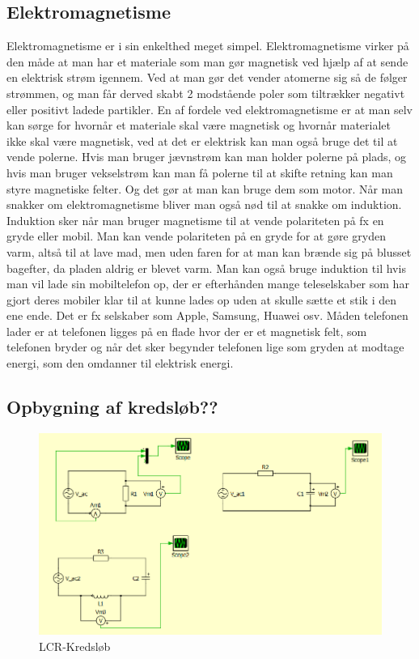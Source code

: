 \subsection{Elektromagnetisme}
Elektromagnetisme er i sin enkelthed meget simpel. Elektromagnetisme virker på den måde at man har et materiale som man gør magnetisk ved hjælp af at sende en elektrisk strøm igennem. Ved at man gør det vender atomerne sig så de følger strømmen, og man får derved skabt 2 modstående poler som tiltrækker negativt eller positivt ladede partikler. En af fordele ved elektromagnetisme er at man selv kan sørge for hvornår et materiale skal være magnetisk og hvornår materialet ikke skal være magnetisk, ved at det er elektrisk kan man også bruge det til at vende polerne. Hvis man bruger jævnstrøm kan man holder polerne på plads, og hvis man bruger vekselstrøm kan man få polerne til at skifte retning kan man styre magnetiske felter. Og det gør at man kan bruge dem som motor. Når man snakker om elektromagnetisme bliver man også nød til at snakke om induktion. Induktion sker når man bruger magnetisme til at vende polariteten på fx en gryde eller mobil. Man kan vende polariteten på en gryde for at gøre gryden varm, altså til at lave mad, men uden faren for at man kan brænde sig på blusset bagefter, da pladen aldrig er blevet varm. Man kan også bruge induktion til hvis man vil lade sin mobiltelefon op, der er efterhånden mange teleselskaber som har gjort deres mobiler klar til at kunne lades op uden at skulle sætte et stik i den ene ende. Det er fx selskaber som Apple, Samsung, Huawei osv. Måden telefonen lader er at telefonen ligges på en flade hvor der er et magnetisk felt, som telefonen bryder og når det sker begynder telefonen lige som gryden at modtage energi, som den omdanner til elektrisk energi.
\newpage
\subsection{Opbygning af kredsløb??}
\begin{figure}[htbp]
	\centering
	\includegraphics[width=1\textwidth]{Vildledning/Schematics/Eks1_LCR.png}
	\caption{LCR-Kredsløb}
	\label{forslag1}
\end{figure}

